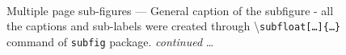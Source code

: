 \documentclass[phd]{ndsu-thesis-2022}
\newcommand\cmd[1]{\textbackslash\texttt{#1}}  %
\begin{document}
\begin{figure}[H]
\hspace{0.5in}
\\
\captionsetup{singlelinecheck=false} %
\caption{Multiple page sub-figures --- General caption of the subfigure - all the captions and sub-labels were created through \cmd{subfloat[\ldots]\{\ldots\}} command of \texttt{subfig} package. \emph{continued} \ldots} \label{fig:1gen}
\end{figure}
\clearpage
\end{document}
